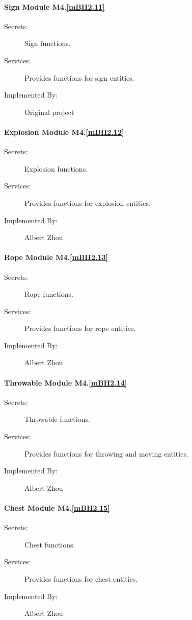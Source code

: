 \documentclass[12pt, titlepage]{article}
\begin{document}
{\paragraph{Sign Module M4.\ref{mBH2.11}}
\begin{description}
\item[Secrets:] Sign functions.
\item[Services:] Provides functions for sign entities. 
\item[Implemented By:] Original project
\end{description}

\paragraph{Explosion Module M4.\ref{mBH2.12}}
\begin{description}
\item[Secrets:] Explosion functions.
\item[Services:] Provides functions for explosion entities. 
\item[Implemented By:] Albert Zhou
\end{description}

\paragraph{Rope Module M4.\ref{mBH2.13}}
\begin{description}
\item[Secrets:] Rope functions.
\item[Services:] Provides functions for rope entities. 
\item[Implemented By:] Albert Zhou
\end{description}

\paragraph{Throwable Module M4.\ref{mBH2.14}}
\begin{description}
\item[Secrets:] Throwable functions.
\item[Services:] Provides functions for throwing and moving entities. 
\item[Implemented By:] Albert Zhou
\end{description}

\paragraph{Chest Module M4.\ref{mBH2.15}}
\begin{description}
\item[Secrets:] Chest functions.
\item[Services:] Provides functions for chest entities. 
\item[Implemented By:] Albert Zhou
\end{description}

}
\end{document}
